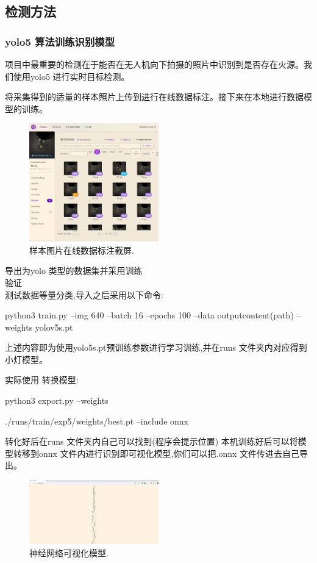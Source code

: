 \documentclass[12pt, a4paper, oneside]{article}
\begin{document}
\subsection{检测方法}

\subsubsection{yolo5 算法训练识别模型}

项目中最重要的检测在于能否在无人机向下拍摄的照片中识别到是否存在火源。我们使用yolo5 进行实时目标检测。

将采集得到的适量的样本照片上传到\href{https://app.roboflow.com/}进行在线数据标注。接下来在本地进行数据模型的训练。

\begin{figure}[H]
    \centering
    \includegraphics[width=0.5\textwidth]{image-13.png}
    \caption{样本图片在线数据标注截屏.}
    \label{image-13}
\end{figure}

导出为yolo 类型的数据集并采⽤训练\\验证\\测试数据等量分类,导⼊之后采⽤以下命令:

python3 train.py --img 640 --batch 16 --epochs 100 --data outputcontent(path) --weights yolov5s.pt

上述内容即为使⽤yolo5s.pt预训练参数进⾏学习训练,并在runs ⽂件夹内对应得到小灯模型。

实际使⽤
转换模型:


python3 export.py --weights

./runs/train/exp5/weights/best.pt --include onnx


转化好后在runs ⽂件夹内⾃⼰可以找到(程序会提⽰位置)
本机训练好后可以将模型转移到onnx ⽂件内进⾏识别即可视化模型,你们可以把.onnx ⽂件传进去⾃⼰导出。

\begin{figure}[H]
    \centering
    \includegraphics[width=0.5\textwidth]{image-14.png}
    \caption{神经网络可视化模型.}
    \label{神经网络可视化模型}
\end{figure}
\end{document}
